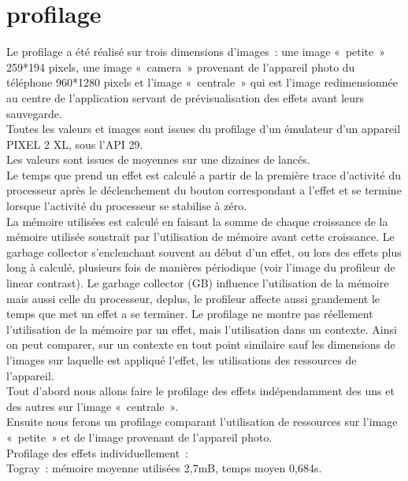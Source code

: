\documentclass[12pt]{article}
\begin{document}
\section{profilage}
    Le profilage  a été réalisé sur trois dimensions d’images : une image « petite » 259*194 pixels,  une image « camera » provenant de l’appareil photo du téléphone 960*1280 pixels et l’image « centrale » qui est l’image redimensionnée au centre de l’application servant de prévisualisation des effets avant leurs sauvegarde.\\
    Toutes les valeurs et images sont issues du profilage d’un émulateur d’un appareil PIXEL 2 XL, sous l’API 29.\\
    Les valeurs sont issues de moyennes sur une dizaines de lancés. \\
    Le temps que prend un effet est calculé a partir de la première trace d’activité du processeur après le déclenchement du bouton correspondant a l’effet et se termine lorsque l’activité du processeur se stabilise à zéro.\\
    La mémoire utilisées est calculé en faisant la somme de chaque  croissance de la mémoire utilisée soustrait par l’utilisation de mémoire avant cette croissance. Le garbage collector s’enclenchant souvent au début d’un effet, ou lors des effets plus long à calculé, plusieurs fois de manières périodique (voir l’image du profileur de linear contrast). Le garbage collector (GB) influence l’utilisation de la mémoire mais aussi celle du processeur, deplus, le profileur affecte aussi grandement le temps que met un effet a se terminer. Le profilage ne montre pas réellement l’utilisation de la mémoire par un effet, mais l’utilisation dans un contexte. Ainsi on peut comparer, sur un contexte en tout point similaire sauf les dimensions de l’images sur laquelle est appliqué l’effet, les utilisations des ressources de l’appareil.\\
    Tout d’abord nous allons faire le profilage des effets indépendamment des uns et des autres sur l’image « centrale ». \\
    Ensuite nous ferons un profilage comparant l’utilisation de ressources sur l’image « petite » et de l’image provenant de l’appareil photo.\\


    Profilage des effets individuellement :\\

    Togray : mémoire moyenne utilisées 2,7mB, temps moyen 0,684s.\\
\end{document}
